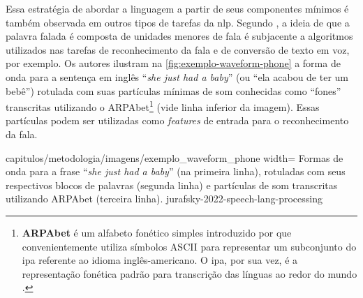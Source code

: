Essa estratégia de abordar a linguagem a partir de seus componentes mínimos é também observada em outros tipos de tarefas da \acrshort{nlp}. Segundo , a ideia de que a palavra falada é composta de unidades menores de fala é subjacente a algoritmos utilizados nas tarefas de reconhecimento da fala e de conversão de texto em voz, por exemplo.
Os autores ilustram na \autoref{fig:exemplo-waveform-phone} a forma de onda para a sentença em inglês ``\textit{she just had a baby}'' (ou ``ela acabou de ter um bebê'') rotulada com suas partículas mínimas de som conhecidas como ``fones'' transcritas utilizando o ARPAbet\footnote{
    \textbf{ARPAbet} é um alfabeto fonético simples introduzido por  que convenientemente utiliza símbolos ASCII para representar um subconjunto do \acrfull{ipa} referente ao idioma inglês-americano. O \acrshort{ipa}, por sua vez, é a representação fonética padrão para transcrição das línguas ao redor do mundo \cite{jurafsky-2022-speech-lang-processing}.
} (vide linha inferior da imagem). Essas partículas podem ser utilizadas como \textit{features} de entrada para o reconhecimento da fala.



    {capitulos/metodologia/imagens/exemplo_waveform_phone}
    {width=\textwidth}
    {Formas de onda para a frase ``\textit{she just had a baby}'' (na primeira linha), rotuladas com seus respectivos blocos de palavras (segunda linha) e partículas de som transcritas utilizando ARPAbet (terceira linha).}
    {jurafsky-2022-speech-lang-processing}


